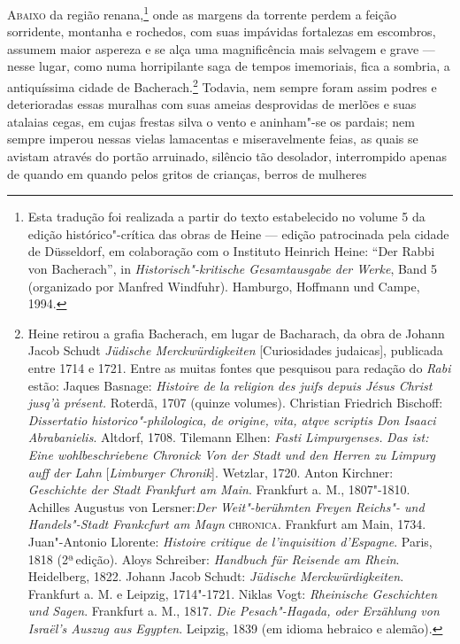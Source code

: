 \textsc{Abaixo} da região renana,\footnote{ Esta tradução foi
realizada a partir do texto estabelecido no volume 5 da edição
histórico"-crítica das obras de Heine --- edição patrocinada pela cidade de
Düsseldorf, em colaboração com o Instituto Heinrich Heine: ``Der Rabbi von
Bacherach'', in \textit{Historisch"-kritische Gesamtausgabe der Werke}, Band 5
(organizado por Manfred Windfuhr).  Hamburgo, Hoffmann und Campe, 1994.}
onde as margens da torrente perdem a feição
sorridente, montanha e rochedos, com suas impávidas fortalezas em
escombros, assumem maior aspereza e se alça uma magnificência mais
selvagem e grave --- nesse lugar, como numa horripilante saga de tempos
imemoriais, fica a sombria, a antiquíssima cidade de
Bacherach.\footnote{ Heine
retirou a grafia Bacherach, em lugar de Bacharach, da obra de Johann
Jacob Schudt \textit{Jüdische Merckwürdigkeiten }[Curiosidades
judaicas], publicada entre 1714 e 1721. Entre as muitas fontes que
pesquisou para redação do \textit{Rabi }estão: Jaques Basnage:
\textit{Histoire de la religion des juifs depuis Jésus Christ
jusq'à présent.} Roterdã, 1707 (quinze volumes).
Christian Friedrich Bischoff: \textit{Dissertatio
historico"-philologica, de origine, vita, atqve scriptis Don Isaaci
Abrabanielis}. Altdorf, 1708.  Tilemann Elhen: \textit{Fasti
Limpurgenses. }\textit{Das ist: Eine wohlbeschriebene Chronick Von der
Stadt und den Herren zu Limpurg auff der Lahn} [\textit{Limburger
Chronik}]. Wetzlar, 1720.   Anton Kirchner: \textit{{Geschichte der
Stadt Frankfurt am Main}}. Frankfurt a. M., 1807"-1810. Achilles
Augustus von Lersner:\textit{{Der Weit"-berühmten Freyen Reichs"- und
Handels"-Stadt Frankcfurt am Mayn}} \textsc{chronica}. Frankfurt am Main, 1734.
 Juan"-Antonio Llorente: \textit{Histoire critique de
l’inquisition d’Espagne}. Paris, 1818 (2ª\,edição). Aloys Schreiber:
\textit{{Handbuch für Reisende am Rhein}}. Heidelberg, 1822.
Johann Jacob Schudt: \textit{{Jüdische Merckwürdigkeiten}}. Frankfurt a.
M. e Leipzig, 1714"-1721. Niklas Vogt: \textit{{Rheinische
Geschichten und Sagen}}. Frankfurt a. M., 1817.  \textit{Die
Pesach"-Hagada, oder Erzählung von Israël’s Auszug aus Egypten}.
Leipzig, 1839 (em idioma hebraico e alemão).}
 Todavia, nem sempre foram assim podres e deterioradas essas muralhas
com suas ameias desprovidas de merlões e suas atalaias cegas, em cujas
frestas silva o vento e aninham"-se os pardais; nem sempre imperou
nessas vielas lamacentas e miseravelmente feias, as quais se avistam
através do portão arruinado, silêncio tão desolador, interrompido
apenas de quando em quando pelos gritos de crianças, berros de mulheres
